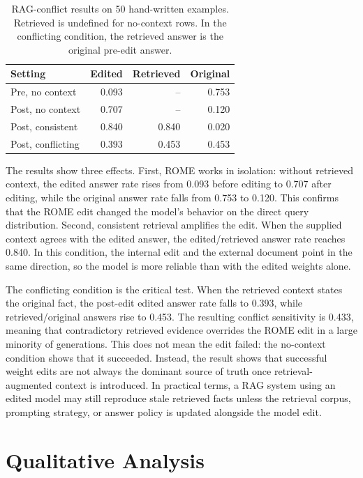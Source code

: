 \documentclass[11pt]{article}
\begin{document}
\begin{table}[!htbp]
\centering
\small
\begin{tabular*}{\columnwidth}{@{\extracolsep{\fill}}lrrr@{}}
\toprule
Setting & Edited & Retrieved & Original \\
\midrule
Pre, no context & 0.093 & -- & 0.753 \\
Post, no context & 0.707 & -- & 0.120 \\
Post, consistent & 0.840 & 0.840 & 0.020 \\
Post, conflicting & 0.393 & 0.453 & 0.453 \\
\bottomrule
\end{tabular*}
\caption{RAG-conflict results on 50 hand-written examples. Retrieved is undefined for no-context rows. In the conflicting condition, the retrieved answer is the original pre-edit answer.}
\label{tab:ragconflict}
\end{table}

The results show three effects. First, ROME works in isolation: without retrieved context, the edited answer rate rises from 0.093 before editing to 0.707 after editing, while the original answer rate falls from 0.753 to 0.120. This confirms that the ROME edit changed the model's behavior on the direct query distribution. Second, consistent retrieval amplifies the edit. When the supplied context agrees with the edited answer, the edited/retrieved answer rate reaches 0.840. In this condition, the internal edit and the external document point in the same direction, so the model is more reliable than with the edited weights alone.

The conflicting condition is the critical test. When the retrieved context states the original fact, the post-edit edited answer rate falls to 0.393, while retrieved/original answers rise to 0.453. The resulting conflict sensitivity is 0.433, meaning that contradictory retrieved evidence overrides the ROME edit in a large minority of generations. This does not mean the edit failed: the no-context condition shows that it succeeded. Instead, the result shows that successful weight edits are not always the dominant source of truth once retrieval-augmented context is introduced. In practical terms, a RAG system using an edited model may still reproduce stale retrieved facts unless the retrieval corpus, prompting strategy, or answer policy is updated alongside the model edit.

\section{Qualitative Analysis}
\end{document}
